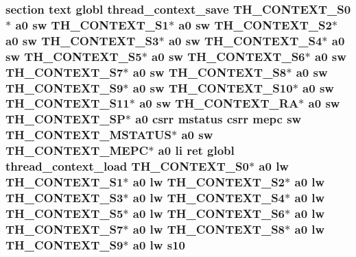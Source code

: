 \hypertarget{riscv_2threada_8S_a3899da86dd4a0818a272facd6269c8b4}{
\subsubsection[{s10}]{\setlength{\rightskip}{0pt plus 5cm}section text globl {\bf thread\-\_\-context\-\_\-save} {\bf T\-H\-\_\-\-C\-O\-N\-T\-E\-X\-T\-\_\-\-S0}$\ast$ {\bf a0} {\bf sw} {\bf T\-H\-\_\-\-C\-O\-N\-T\-E\-X\-T\-\_\-\-S1}$\ast$ {\bf a0} {\bf sw} {\bf T\-H\-\_\-\-C\-O\-N\-T\-E\-X\-T\-\_\-\-S2}$\ast$ {\bf a0} {\bf sw} {\bf T\-H\-\_\-\-C\-O\-N\-T\-E\-X\-T\-\_\-\-S3}$\ast$ {\bf a0} {\bf sw} {\bf T\-H\-\_\-\-C\-O\-N\-T\-E\-X\-T\-\_\-\-S4}$\ast$ {\bf a0} {\bf sw} {\bf T\-H\-\_\-\-C\-O\-N\-T\-E\-X\-T\-\_\-\-S5}$\ast$ {\bf a0} {\bf sw} {\bf T\-H\-\_\-\-C\-O\-N\-T\-E\-X\-T\-\_\-\-S6}$\ast$ {\bf a0} {\bf sw} {\bf T\-H\-\_\-\-C\-O\-N\-T\-E\-X\-T\-\_\-\-S7}$\ast$ {\bf a0} {\bf sw} {\bf T\-H\-\_\-\-C\-O\-N\-T\-E\-X\-T\-\_\-\-S8}$\ast$ {\bf a0} {\bf sw} {\bf T\-H\-\_\-\-C\-O\-N\-T\-E\-X\-T\-\_\-\-S9}$\ast$ {\bf a0} {\bf sw} {\bf T\-H\-\_\-\-C\-O\-N\-T\-E\-X\-T\-\_\-\-S10}$\ast$ {\bf a0} {\bf sw} {\bf T\-H\-\_\-\-C\-O\-N\-T\-E\-X\-T\-\_\-\-S11}$\ast$ {\bf a0} {\bf sw} {\bf T\-H\-\_\-\-C\-O\-N\-T\-E\-X\-T\-\_\-\-R\-A}$\ast$ {\bf a0} {\bf sw} {\bf T\-H\-\_\-\-C\-O\-N\-T\-E\-X\-T\-\_\-\-S\-P}$\ast$ {\bf a0} csrr {\bf mstatus} csrr {\bf mepc} {\bf sw} {\bf T\-H\-\_\-\-C\-O\-N\-T\-E\-X\-T\-\_\-\-M\-S\-T\-A\-T\-U\-S}$\ast$ {\bf a0} {\bf sw} {\bf T\-H\-\_\-\-C\-O\-N\-T\-E\-X\-T\-\_\-\-M\-E\-P\-C}$\ast$ {\bf a0} {\bf li} ret globl {\bf thread\-\_\-context\-\_\-load} {\bf T\-H\-\_\-\-C\-O\-N\-T\-E\-X\-T\-\_\-\-S0}$\ast$ {\bf a0} {\bf lw} {\bf T\-H\-\_\-\-C\-O\-N\-T\-E\-X\-T\-\_\-\-S1}$\ast$ {\bf a0} {\bf lw} {\bf T\-H\-\_\-\-C\-O\-N\-T\-E\-X\-T\-\_\-\-S2}$\ast$ {\bf a0} {\bf lw} {\bf T\-H\-\_\-\-C\-O\-N\-T\-E\-X\-T\-\_\-\-S3}$\ast$ {\bf a0} {\bf lw} {\bf T\-H\-\_\-\-C\-O\-N\-T\-E\-X\-T\-\_\-\-S4}$\ast$ {\bf a0} {\bf lw} {\bf T\-H\-\_\-\-C\-O\-N\-T\-E\-X\-T\-\_\-\-S5}$\ast$ {\bf a0} {\bf lw} {\bf T\-H\-\_\-\-C\-O\-N\-T\-E\-X\-T\-\_\-\-S6}$\ast$ {\bf a0} {\bf lw} {\bf T\-H\-\_\-\-C\-O\-N\-T\-E\-X\-T\-\_\-\-S7}$\ast$ {\bf a0} {\bf lw} {\bf T\-H\-\_\-\-C\-O\-N\-T\-E\-X\-T\-\_\-\-S8}$\ast$ {\bf a0} {\bf lw} {\bf T\-H\-\_\-\-C\-O\-N\-T\-E\-X\-T\-\_\-\-S9}$\ast$ {\bf a0} {\bf lw} s10}}\label{riscv_2threada_8S_a3899da86dd4a0818a272facd6269c8b4}
